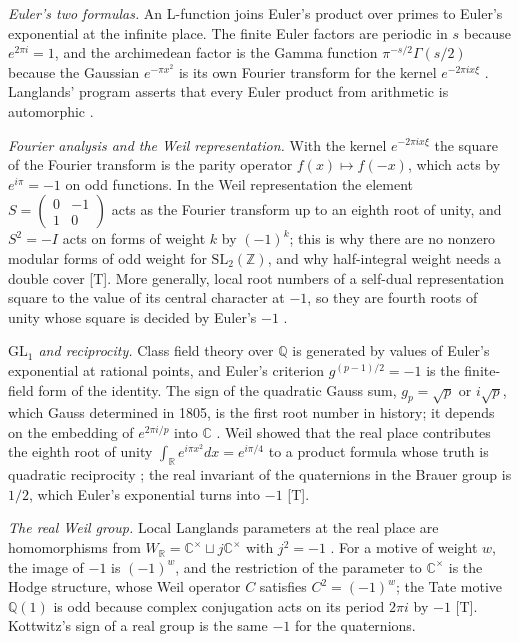 \documentclass[11pt]{amsart}
\numberwithin{equation}{section}
\newcommand{\Q}{\mathbb{Q}}
\newcommand{\R}{\mathbb{R}}
\newcommand{\C}{\mathbb{C}}
\newcommand{\Z}{\mathbb{Z}}
\newcommand{\GL}{\mathrm{GL}}
\newcommand{\SL}{\mathrm{SL}}
\begin{document}
\emph{Euler's two formulas.} An L-function joins Euler's product over primes to Euler's exponential at the infinite place. The finite Euler factors are periodic in $s$ because $e^{2\pi i}=1$, and the archimedean factor is the Gamma function $\pi^{-s/2}\Gamma(s/2)$ because the Gaussian $e^{-\pi x^2}$ is its own Fourier transform for the kernel $e^{-2\pi i x\xi}$ \cite{Tate1950}. Langlands' program asserts that every Euler product from arithmetic is automorphic \cite{LanglandsProblems1970}.

\emph{Fourier analysis and the Weil representation.} With the kernel $e^{-2\pi i x\xi}$ the square of the Fourier transform is the parity operator $f(x)\mapsto f(-x)$, which acts by $e^{i\pi}=-1$ on odd functions. In the Weil representation the element $S=\left(\begin{smallmatrix}0&-1\\1&0\end{smallmatrix}\right)$ acts as the Fourier transform up to an eighth root of unity, and $S^2=-I$ acts on forms of weight $k$ by $(-1)^k$; this is why there are no nonzero modular forms of odd weight for $\SL_2(\Z)$, and why half-integral weight needs a double cover [T]. More generally, local root numbers of a self-dual representation square to the value of its central character at $-1$, so they are fourth roots of unity whose square is decided by Euler's $-1$ \cite{Tate1979}.

\emph{$\GL_1$ and reciprocity.} Class field theory over $\Q$ is generated by values of Euler's exponential at rational points, and Euler's criterion $g^{(p-1)/2}=-1$ is the finite-field form of the identity. The sign of the quadratic Gauss sum, $g_p=\sqrt p$ or $i\sqrt p$, which Gauss determined in 1805, is the first root number in history; it depends on the embedding of $e^{2\pi i/p}$ into $\C$ \cite{Gauss1811}. Weil showed that the real place contributes the eighth root of unity $\int_\R e^{i\pi x^2}dx=e^{i\pi/4}$ to a product formula whose truth is quadratic reciprocity \cite{Weil1964}; the real invariant of the quaternions in the Brauer group is $1/2$, which Euler's exponential turns into $-1$ [T].

\emph{The real Weil group.} Local Langlands parameters at the real place are homomorphisms from $W_\R=\C^\times\sqcup j\C^\times$ with $j^2=-1$ \cite{Langlands1973}. For a motive of weight $w$, the image of $-1$ is $(-1)^w$, and the restriction of the parameter to $\C^\times$ is the Hodge structure, whose Weil operator $C$ satisfies $C^2=(-1)^w$; the Tate motive $\Q(1)$ is odd because complex conjugation acts on its period $2\pi i$ by $-1$ [T]. Kottwitz's sign of a real group \cite{Kottwitz1983} is the same $-1$ for the quaternions.
\end{document}
